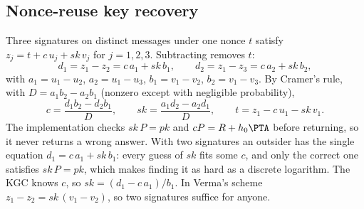 \subsection{Nonce-reuse key recovery}\label{app:nonce}
Three signatures on distinct messages under one nonce $t$ satisfy $z_j=t+c\,u_j+sk\,v_j$ for $j=1,2,3$.
Subtracting removes $t$:
\[
d_1=z_1-z_2=c\,a_1+sk\,b_1,\qquad d_2=z_1-z_3=c\,a_2+sk\,b_2,
\]
with $a_1=u_1-u_2$, $a_2=u_1-u_3$, $b_1=v_1-v_2$, $b_2=v_1-v_3$. By Cramer's rule, with
$D=a_1b_2-a_2b_1$ (nonzero except with negligible probability),
\[
c=\frac{d_1b_2-d_2b_1}{D},\qquad sk=\frac{a_1d_2-a_2d_1}{D},\qquad t=z_1-c\,u_1-sk\,v_1 .
\]
The implementation checks $sk\,P=pk$ and $cP=R+h_0\PTA$ before returning, so it never returns a wrong
answer. With two signatures an outsider has the single equation $d_1=c\,a_1+sk\,b_1$: every guess of
$sk$ fits some $c$, and only the correct one satisfies $sk\,P=pk$, which makes finding it as hard as a
discrete logarithm. The KGC knows $c$, so $sk=(d_1-c\,a_1)/b_1$. In Verma's scheme
$z_1-z_2=sk\,(v_1-v_2)$, so two signatures suffice for anyone.

